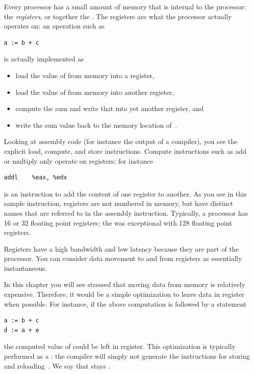 Every processor has a small amount of memory that is internal to the
processor: the \emph{registers}, or together the
. The registers are what the processor
actually operates on: an operation such as 
\begin{verbatim}
a := b + c
\end{verbatim}
is actually implemented as 
\begin{itemize}
\item load the value of  from memory into a register,
\item load the value of  from memory into another register,
\item compute the sum and write that into yet another register, and
\item write the sum value back to the memory location of~.
\end{itemize}
Looking at assembly code (for instance the output of a compiler), you
see the explicit load, compute, and store instructions.
Compute instructions such as add or multiply only operate on
registers; for instance
\begin{verbatim}
addl	%eax, %edx
\end{verbatim}
is an instruction to add the content of one register to
another. As you see in this sample instruction, registers are not
numbered in memory, but have distinct names that are referred to in
the assembly instruction. Typically, a processor has 16 or 32
floating point registers; the  was
exceptional with 128 floating point registers.

Registers have a high bandwidth and low latency because they
are part of the processor. You can consider data movement to and from
registers as essentially instantaneous.

In this chapter you will see stressed that moving data from memory is
relatively expensive. Therefore, it would be a simple optimization to
leave data in register when possible. For instance, if the above
computation is followed by a statement
\begin{verbatim}
a := b + c
d := a + e
\end{verbatim}
the computed value of  could be left in register. This
optimization is typically performed as a
: the compiler will simply not
generate the instructions for storing and reloading~. We say that
 stays .

